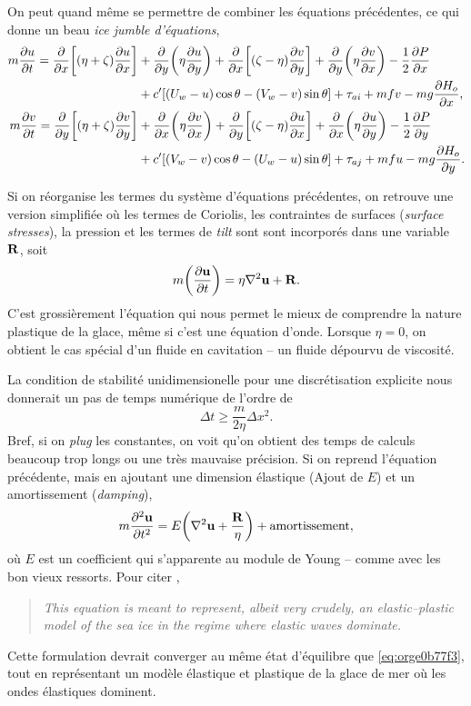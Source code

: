 \documentclass[10pt]{article}
\numberwithin{equation}{section}
\newcommand{\uu}{\vb{u}}
\begin{document}
On peut quand même se permettre de combiner les équations précédentes, ce qui donne un beau \emph{ice jumble d'équations},
\begin{align}
   m \pdv{u}{t} = \pdv{}{x}\qty[(\eta + \zeta)\pdv{u}{x}] &+\pdv{}{y}\qty(\eta\pdv{u}{y}) + \pdv{}{x}\qty[(\zeta-\eta)\pdv{v}{y}] + \pdv{}{y}\qty(\eta \pdv{v}{x}) - \frac{1}{2}\pdv{P}{x}\nonumber\\
     & + c'\qty[\qty(U_w-u)\cos\theta - \qty(V_w-v)\sin\theta] + \tau_{ai} + mfv - mg\pdv{H_o}{x},\\
   m \pdv{v}{t} = \pdv{}{y}\qty[(\eta + \zeta)\pdv{v}{y}] &+\pdv{}{x}\qty(\eta\pdv{v}{x}) + \pdv{}{y}\qty[(\zeta-\eta)\pdv{u}{x}] + \pdv{}{x}\qty(\eta \pdv{u}{y}) - \frac{1}{2}\pdv{P}{y}\nonumber\\
     & + c'\qty[\qty(V_w-v)\cos\theta - \qty(U_w-u)\sin\theta] + \tau_{aj} + mfu - mg\pdv{H_o}{y}.
\end{align}

Si on réorganise les termes du système d'équations précédentes, on retrouve une version simplifiée où les termes de Coriolis, les contraintes de surfaces (\emph{surface stresses}), la pression et les termes de \emph{tilt} sont sont incorporés dans une variable \(\vb{R}\), soit
\begin{equation}
\label{eq:orge0b77f3}
   m\qty(\pdv{\uu}{t}) = \eta \laplacian{\uu} + \vb{R}.
\end{equation}
C'est grossièrement l'équation qui nous permet le mieux de comprendre la nature plastique de la glace, même si c'est une équation d'onde. 
Lorsque \(\eta=0\), on obtient le cas spécial d'un fluide en cavitation -- un fluide dépourvu de viscosité.\bigskip

La condition de stabilité unidimensionelle pour une discrétisation explicite nous donnerait un pas de temps numérique de l'ordre de
\begin{equation}
   \Delta t \geq \frac{m}{2\eta} \Delta x^2.
\end{equation}
Bref, si on \emph{plug} les constantes, on voit qu'on obtient des temps de calculs beaucoup trop longs ou une très mauvaise précision.
Si on reprend l'équation précédente, mais en ajoutant une dimension élastique (Ajout de \(E\)) et un amortissement (\emph{damping}),
\begin{equation}
\label{eq:orgd09d0bf}
   m \pdv[2]{\uu}{t} =E \qty(\laplacian{\uu} + \frac{\vb{R}}{\eta}) + \text{amortissement},
\end{equation}
où \(E\) est un coefficient qui s'apparente au module de Young -- comme avec les bon vieux ressorts. 
Pour citer \Textcite{hunke1997elastic},
\begin{quote}
\emph{This equation is meant to represent, albeit very crudely, an elastic–plastic model of the sea ice in the regime where elastic waves dominate.}
\end{quote}
Cette formulation devrait converger au même état d'équilibre que \ref{eq:orge0b77f3}, tout en représentant un modèle élastique et plastique de la glace de mer où les ondes élastiques dominent.\bigskip
\end{document}
